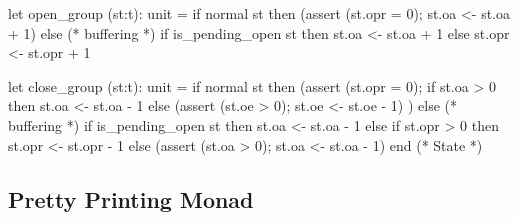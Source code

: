 \documentclass[12pt]{article}
\begin{document}
\begin{ocaml}
    let open_group (st:t): unit =
      if normal st then
        (assert (st.opr = 0); st.oa <- st.oa + 1)
      else (* buffering *)
        if is_pending_open st then
          st.oa <- st.oa + 1
        else
          st.opr <- st.opr + 1

    let close_group (st:t): unit =
      if normal st then
        (assert (st.opr = 0);
         if st.oa > 0 then
           st.oa <- st.oa - 1
         else
           (assert (st.oe > 0); st.oe <- st.oe - 1)
        )
      else (* buffering *)
        if is_pending_open st then
          st.oa <- st.oa - 1
        else if st.opr > 0 then
          st.opr <- st.opr - 1
        else
          (assert (st.oa > 0); st.oa <- st.oa - 1)
  end (* State *)
\end{ocaml}




\subsection{Pretty Printing Monad}
\end{document}
